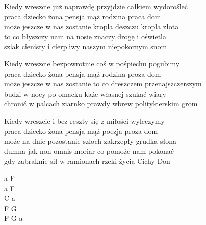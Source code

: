 \begin{text}
    Kiedy wreszcie już naprawdę przyjdzie całkiem wydorośleć\\
    praca dziecko żona pensja mąż rodzina praca dom\\
    może jeszcze w nas zostanie kropla deszczu kropla złota\\
    to co błyszczy nam na nosie znaczy drogę i oświetla\\
    szlak cienisty i cierpliwy naszym niepokornym snom

    Kiedy wreszcie bezpowrotnie coś w pośpiechu pogubimy\\
    praca dziecko żona pensja mąż rodzina proza dom\\
    może jeszcze w nas zostanie to co dreszczem przenajszczerszym\\
    budzi w nocy po omacku każe własnej szukać wiary\\
    chronić w palcach ziarnko prawdy wbrew politykierskim grom

    Kiedy wreszcie i bez reszty się z miłości wyleczymy\\
    praca dziecko żona pensja mąż poezja proza dom\\
    może na dnie pozostanie szloch zakrzepły grudka słona\\
    dumna jak non omnis moriar co pomoże nam pokonać\\
    gdy zabraknie sił w ramionach rzeki życia Cichy Don
\end{text}
\begin{chord}
    a F\\
    a F\\
    C a\\
    F G\\
    F G a
\end{chord}
